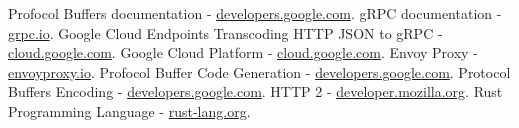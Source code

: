 \documentclass{article}
\begin{document}
\begin{thebibliography}{9}
    Profocol Buffers documentation - \href{https://developers.google.com/protocol-buffers}{developers.google.com}.
    gRPC documentation - \href{https://grpc.io/docs/}{grpc.io}.
    Google Cloud Endpoints Transcoding HTTP JSON to gRPC - \href{https://cloud.google.com/endpoints/docs/grpc/transcoding}{cloud.google.com}.
    Google Cloud Platform - \href{https://cloud.google.com/}{cloud.google.com}.
    Envoy Proxy - \href{https://www.envoyproxy.io/docs/envoy/latest/intro/arch_overview/arch_overview}{envoyproxy.io}.
    Profocol Buffer Code Generation - \href{https://developers.google.com/protocol-buffers/docs/reference/go-generated}{developers.google.com}.
    Protocol Buffers Encoding - \href{https://developers.google.com/protocol-buffers/docs/encoding}{developers.google.com}.
    HTTP 2 - \href{https://developer.mozilla.org/en-US/docs/Glossary/HTTP_2}{developer.mozilla.org}.
    Rust Programming Language - \href{https://www.rust-lang.org/}{rust-lang.org}.
\end{thebibliography}
\end{document}
